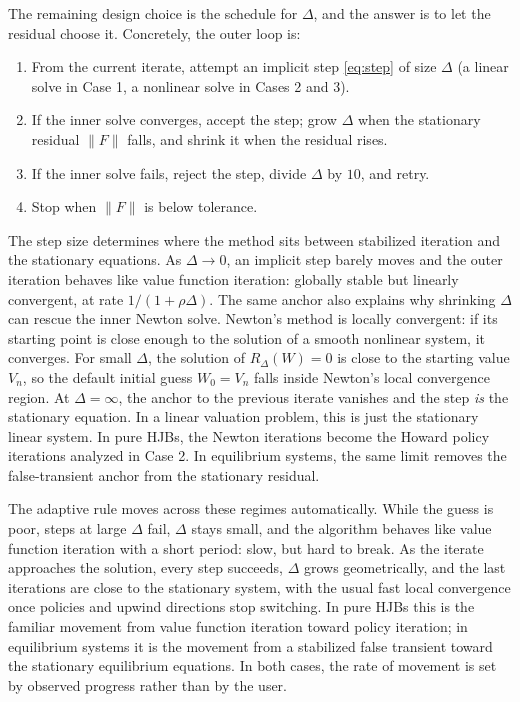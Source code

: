 \documentclass[11pt]{article}
\numberwithin{equation}{section}
\begin{document}
	The remaining design choice is the schedule for $\Delta$, and the answer is to let the residual choose it. Concretely, the outer loop is:
	\begin{enumerate}
		\item From the current iterate, attempt an implicit step \eqref{eq:step} of size $\Delta$ (a linear solve in Case 1, a nonlinear solve in Cases 2 and 3).
		\item If the inner solve converges, accept the step; grow $\Delta$ when the stationary residual $\lVert F \rVert$ falls, and shrink it when the residual rises.
		\item If the inner solve fails, reject the step, divide $\Delta$ by $10$, and retry.
		\item Stop when $\lVert F \rVert$ is below tolerance.
	\end{enumerate}
				The step size determines where the method sits between stabilized iteration and the stationary equations. As $\Delta \to 0$, an implicit step barely moves and the outer iteration behaves like value function iteration: globally stable but linearly convergent, at rate $1/(1+\rho\Delta)$. The same anchor also explains why shrinking $\Delta$ can rescue the inner Newton solve. Newton's method is locally convergent: if its starting point is close enough to the solution of a smooth nonlinear system, it converges. For small $\Delta$, the solution of $R_\Delta(W)=0$ is close to the starting value $V_n$, so the default initial guess $W_0=V_n$ falls inside Newton's local convergence region. At $\Delta = \infty$, the anchor to the previous iterate vanishes and the step \emph{is} the stationary equation. In a linear valuation problem, this is just the stationary linear system. In pure HJBs, the Newton iterations become the Howard policy iterations analyzed in Case 2. In equilibrium systems, the same limit removes the false-transient anchor from the stationary residual.

		The adaptive rule moves across these regimes automatically. While the guess is poor, steps at large $\Delta$ fail, $\Delta$ stays small, and the algorithm behaves like value function iteration with a short period: slow, but hard to break. As the iterate approaches the solution, every step succeeds, $\Delta$ grows geometrically, and the last iterations are close to the stationary system, with the usual fast local convergence once policies and upwind directions stop switching. In pure HJBs this is the familiar movement from value function iteration toward policy iteration; in equilibrium systems it is the movement from a stabilized false transient toward the stationary equilibrium equations. In both cases, the rate of movement is set by observed progress rather than by the user.
\end{document}
